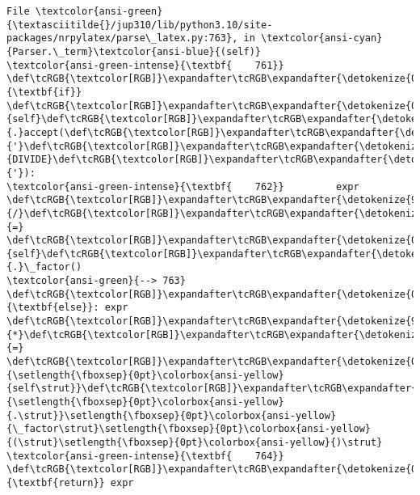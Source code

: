 \documentclass[landscape,letterpaper,10pt,english]{article}
\begin{document}
\begin{Verbatim}[commandchars=\\\{\}, frame=single, framerule=2mm, rulecolor=\color{outerrorbackground}]
File \textcolor{ansi-green}{\textasciitilde{}/jup310/lib/python3.10/site-packages/nrpylatex/parse\_latex.py:763}, in \textcolor{ansi-cyan}{Parser.\_term}\textcolor{ansi-blue}{(self)}
\textcolor{ansi-green-intense}{\textbf{    761}}     \def\tcRGB{\textcolor[RGB]}\expandafter\tcRGB\expandafter{\detokenize{0,135,0}}{\textbf{if}} \def\tcRGB{\textcolor[RGB]}\expandafter\tcRGB\expandafter{\detokenize{0,135,0}}{self}\def\tcRGB{\textcolor[RGB]}\expandafter\tcRGB\expandafter{\detokenize{98,98,98}}{.}accept(\def\tcRGB{\textcolor[RGB]}\expandafter\tcRGB\expandafter{\detokenize{175,0,0}}{'}\def\tcRGB{\textcolor[RGB]}\expandafter\tcRGB\expandafter{\detokenize{175,0,0}}{DIVIDE}\def\tcRGB{\textcolor[RGB]}\expandafter\tcRGB\expandafter{\detokenize{175,0,0}}{'}):
\textcolor{ansi-green-intense}{\textbf{    762}}         expr \def\tcRGB{\textcolor[RGB]}\expandafter\tcRGB\expandafter{\detokenize{98,98,98}}{/}\def\tcRGB{\textcolor[RGB]}\expandafter\tcRGB\expandafter{\detokenize{98,98,98}}{=} \def\tcRGB{\textcolor[RGB]}\expandafter\tcRGB\expandafter{\detokenize{0,135,0}}{self}\def\tcRGB{\textcolor[RGB]}\expandafter\tcRGB\expandafter{\detokenize{98,98,98}}{.}\_factor()
\textcolor{ansi-green}{--> 763}     \def\tcRGB{\textcolor[RGB]}\expandafter\tcRGB\expandafter{\detokenize{0,135,0}}{\textbf{else}}: expr \def\tcRGB{\textcolor[RGB]}\expandafter\tcRGB\expandafter{\detokenize{98,98,98}}{*}\def\tcRGB{\textcolor[RGB]}\expandafter\tcRGB\expandafter{\detokenize{98,98,98}}{=} \def\tcRGB{\textcolor[RGB]}\expandafter\tcRGB\expandafter{\detokenize{0,135,0}}{\setlength{\fboxsep}{0pt}\colorbox{ansi-yellow}{self\strut}}\def\tcRGB{\textcolor[RGB]}\expandafter\tcRGB\expandafter{\detokenize{98,98,98}}{\setlength{\fboxsep}{0pt}\colorbox{ansi-yellow}{.\strut}}\setlength{\fboxsep}{0pt}\colorbox{ansi-yellow}{\_factor\strut}\setlength{\fboxsep}{0pt}\colorbox{ansi-yellow}{(\strut}\setlength{\fboxsep}{0pt}\colorbox{ansi-yellow}{)\strut}
\textcolor{ansi-green-intense}{\textbf{    764}} \def\tcRGB{\textcolor[RGB]}\expandafter\tcRGB\expandafter{\detokenize{0,135,0}}{\textbf{return}} expr


\end{Verbatim}
\end{document}
